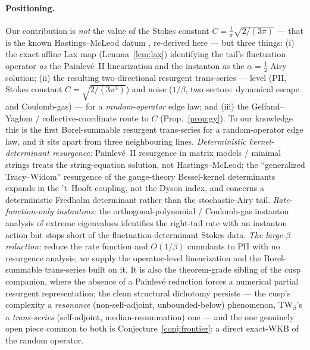 \documentclass[11pt,reqno]{amsart}
\theoremstyle{plain}
\theoremstyle{definition}
\theoremstyle{remark}
\newcommand{\TW}{\mathrm{TW}_\beta}
\begin{document}
\paragraph{Positioning.} Our contribution is \emph{not} the value of the Stokes constant
$C=\tfrac1\pi\sqrt{2/(3\pi)}$ --- that is the known Hastings--McLeod datum
\cite{Dunne2025,KapaevHM,FIKN}, re-derived here --- but three things: (i) the exact affine Lax map
(Lemma~\ref{lem:lax}) identifying the tail's fluctuation operator \emph{as} the Painlev\'e~II
linearization and the instanton as the $\alpha=\tfrac12$ Airy solution; (ii) the resulting
two-directional resurgent trans-series --- level (PII, Stokes constant $C=\sqrt{2/(3\pi^3)}$) and
noise ($1/\beta$, two sectors: dynamical escape and Coulomb-gas) --- for a \emph{random-operator}
edge law; and (iii) the Gelfand--Yaglom / collective-coordinate route to $C$ (Prop.~\ref{prop:gy}).
To our knowledge this is the first Borel-summable resurgent trans-series for a random-operator edge
law, and it sits apart from three neighbouring lines. \emph{Deterministic kernel-determinant
resurgence:} Painlev\'e~II resurgence in matrix models / minimal strings \cite{SchiappaVaz} treats
the string-equation solution, not Hastings--McLeod; the ``generalized Tracy--Widom'' resurgence of
the gauge-theory Bessel-kernel determinants \cite{BajnokTW,BajnokUniv} expands in the 't~Hooft
coupling, not the Dyson index, and concerns a deterministic Fredholm determinant rather than the
stochastic-Airy tail. \emph{Rate-function-only instantons:} the orthogonal-polynomial / Coulomb-gas
instanton analysis of extreme eigenvalues \cite{AtkinZohren} identifies the right-tail rate with an
instanton action but stops short of the fluctuation-determinant Stokes data. \emph{The large-$\beta$
reduction:} \cite{CLDS} reduce the rate function and $O(1/\beta)$ cumulants to PII with no resurgence
analysis; we supply the operator-level linearization and the Borel-summable trans-series built on it.
It is also the theorem-grade sibling of the cusp companion, where the absence of a Painlev\'e
reduction forces a numerical partial resurgent representation; the clean structural dichotomy
persists --- the cusp's complexity a \emph{resonance} (non-self-adjoint, unbounded-below) phenomenon,
$\TW$'s a \emph{trans-series} (self-adjoint, median-resummation) one --- and the one genuinely open
piece common to both is Conjecture~\ref{conj:frontier}: a direct exact-WKB of the random operator.
\end{document}
